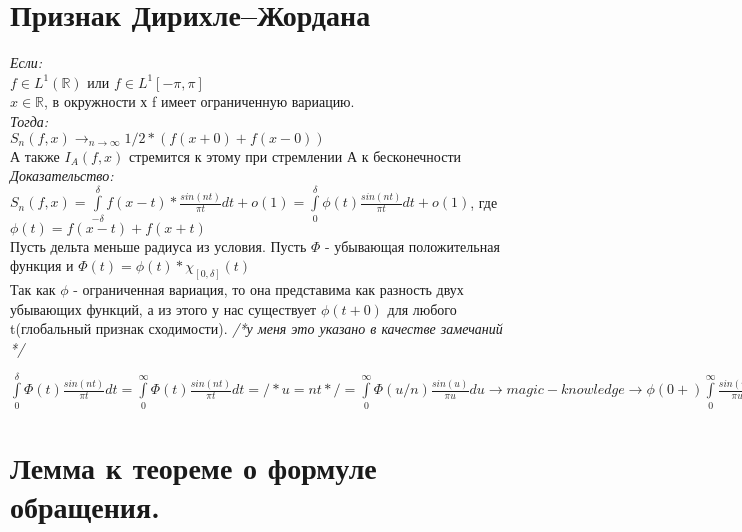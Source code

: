\documentclass[paper=a4, fontsize=17pt]{article}
\begin{document}
\section{Признак Дирихле--Жордана}
\emph{Если:} \\
	$f \in L^{1}(\mathds{R})$ или $f \in L^{1}[-\pi, \pi]$ \\
	$x \in \mathds{R}$, в окружности х f имеет ограниченную вариацию.\\
\emph {Тогда:} \\
   $S_n(f, x) \rightarrow_{n \rightarrow \infty} 1/2 * (f(x + 0) + f(x - 0))$ \\
   А также $I_A(f, x)$ стремится к этому при стремлении А к бесконечности
\emph{Доказательство:}\\
	$S_n(f, x) = \int\limits_{-\delta}^{\delta}f(x - t) * \frac{sin(n t)}{\pi t} dt + o(1) = \int\limits_{0}^{\delta} \phi(t) \frac{sin(n t)}{\pi t} dt + o(1) $, где $\phi(t) = f(x - t) + f(x + t)$ \\
	Пусть дельта меньше радиуса из условия. Пусть $\Phi$ - убывающая положительная функция и $\Phi(t) = \phi(t) * \chi_{[0, \delta]}(t)$ \\
	Так как $\phi$ - ограниченная вариация, то она представима как разность двух убывающих функций, а из этого у нас существует $\phi(t+0)$ для любого t(глобальный признак сходимости). \textit{/*у меня это указано в качестве замечаний */}
	
	$\int\limits_{0}^{\delta} \Phi(t) \frac{sin(n t)}{\pi t} dt = \int\limits_{0}^{\infty} \Phi(t) \frac{sin(n t)}{\pi t} dt = /* u=nt */ = \int\limits_{0}^{\infty} \Phi(u / n) \frac{sin(u)}{\pi u} du \rightarrow magic-knowledge \rightarrow \phi(0+) \int\limits_{0}^{\infty} \frac{sin(u)}{\pi u} du = 1 / 2 * \phi(0+)$
\section{Лемма к теореме о формуле обращения.}
\end{document}
